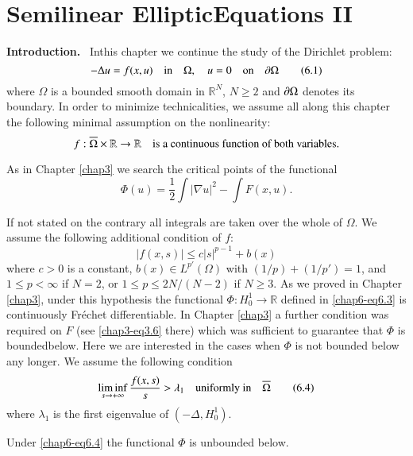 \chapter[Semilinear Elliptic Equations II]{Semilinear
  Elliptic\hfill\break  Equations II}\label{chap6}

{\bf Introduction.}~ In\pageoriginale  this chapter we continue the
study of the Dirichlet problem:
\begin{equation*}
-\Delta u=f(x,u)\quad\text{in}\quad \Omega,\quad u=0\quad\text{on}\quad \partial
\Omega\tag{6.1}\label{chap6-eq6.1} 
\end{equation*}
where $\Omega$ is a bounded smooth domain in $\mathbb{R}^{N}$, $N\geq
2$ and $\partial \Omega$ denotes its boundary. In order to minimize
technicalities, we assume all along this chapter the following minimal
assumption on the nonlinearity:
$$
f:\overline{\Omega}\times\mathbb{R}\to \mathbb{R}\quad\text{is a
  continuous function of both variables.}
$$

As in Chapter \ref{chap3} we search the critical points of the
functional
\begin{equation*}
\Phi(u)=\frac{1}{2}\int|\nabla u|^{2}-\int
F(x,u).\tag{6.2}\label{chap6-eq6.2} 
\end{equation*}

If not stated on the contrary all integrals are taken over the whole
of $\Omega$. We assume the following additional condition of $f$: 
\begin{equation*}
|f(x,s)|\leq c|s|^{p-1}+b(x)\tag{6.3}\label{chap6-eq6.3} 
\end{equation*}
where $c>0$ is a constant, $b(x)\in L^{p'}(\Omega)$ with
$(1/p)+(1/p')=1$, and $1\leq p<\infty$ if $N=2$, or $1\leq p\leq
2N/(N-2)$ if $N\geq 3$. As we proved in Chapter \ref{chap3}, under
this hypothesis the functional $\Phi:H^{1}_{0}\to \mathbb{R}$ defined
in \eqref{chap6-eq6.3} is continuously Fr\'echet differentiable. In
Chapter \ref{chap3} a further condition was required on $F$ (see
\eqref{chap3-eq3.6} there) which was sufficient to guarantee that
$\Phi$ is bounded\pageoriginale below. Here we are interested in the
cases when $\Phi$ is not bounded below any longer. We assume the
following condition
\begin{equation*}
\mathop{\lim\inf}_{s\to+\infty}\frac{f(x,s)}{s}>\lambda_{1}\quad\text{uniformly
  in}\quad \overline{\Omega}\tag{6.4}\label{chap6-eq6.4}
\end{equation*}
where $\lambda_{1}$ is the first eigenvalue of $(-\Delta,H^{1}_{0})$.

\begin{lemma}\label{chap6-lem6.1}
Under \eqref{chap6-eq6.4} the functional $\Phi$ is unbounded below.
\end{lemma}

